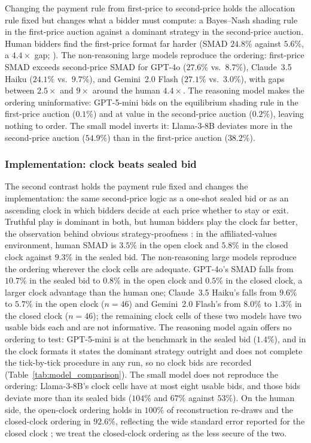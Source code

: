 \documentclass{article} %
\newif\ifmarkrev
\newcommand{\rev}[1]{\ifmarkrev\begingroup\color{red}#1\endgroup\else#1\fi}
\begin{document}
\rev{Changing the payment rule from first-price to second-price holds the allocation rule fixed but changes what a bidder must compute: a Bayes--Nash shading rule in the first-price auction against a dominant strategy in the second-price auction. Human bidders find the first-price format far harder (SMAD $24.8\%$ against $5.6\%$, a $4.4\times$ gap; \citealp{kagel1993independent}). The non-reasoning large models reproduce the ordering: first-price SMAD exceeds second-price SMAD for GPT-4o ($27.6\%$ vs.\ $8.7\%$), Claude~3.5 Haiku ($24.1\%$ vs.\ $9.7\%$), and Gemini~2.0 Flash ($27.1\%$ vs.\ $3.0\%$), with gaps between $2.5\times$ and $9\times$ around the human $4.4\times$. The reasoning model makes the ordering uninformative: GPT-5-mini bids on the equilibrium shading rule in the first-price auction ($0.1\%$) and at value in the second-price auction ($0.2\%$), leaving nothing to order. The small model inverts it: Llama-3-8B deviates more in the second-price auction ($54.9\%$) than in the first-price auction ($38.2\%$).}

\subsubsection{\texorpdfstring{\rev{Implementation: clock beats sealed bid}}{Implementation: clock beats sealed bid}}

\rev{The second contrast holds the payment rule fixed and changes the implementation: the same second-price logic as a one-shot sealed bid or as an ascending clock in which bidders decide at each price whether to stay or exit. Truthful play is dominant in both, but human bidders play the clock far better, the observation behind obvious strategy-proofness \citep{li2017obviously, breitmoser2022obviousness}: in the affiliated-values environment, human SMAD is $3.5\%$ in the open clock and $5.8\%$ in the closed clock against $9.3\%$ in the sealed bid. The non-reasoning large models reproduce the ordering wherever the clock cells are adequate. GPT-4o's SMAD falls from $10.7\%$ in the sealed bid to $0.8\%$ in the open clock and $0.5\%$ in the closed clock, a larger clock advantage than the human one; Claude~3.5 Haiku's falls from $9.6\%$ to $5.7\%$ in the open clock ($n=46$) and Gemini~2.0 Flash's from $8.0\%$ to $1.3\%$ in the closed clock ($n=46$); the remaining clock cells of these two models have two usable bids each and are not informative. The reasoning model again offers no ordering to test: GPT-5-mini is at the benchmark in the sealed bid ($1.4\%$), and in the clock formats it states the dominant strategy outright and does not complete the tick-by-tick procedure in any run, so no clock bids are recorded (Table~\ref{tab:model_comparison}). The small model does not reproduce the ordering: Llama-3-8B's clock cells have at most eight usable bids, and those bids deviate more than its sealed bids ($104\%$ and $67\%$ against $53\%$). On the human side, the open-clock ordering holds in $100\%$ of reconstruction re-draws and the closed-clock ordering in $92.6\%$, reflecting the wide standard error reported for the closed clock \citep{breitmoser2022obviousness}; we treat the closed-clock ordering as the less secure of the two.}
\end{document}
